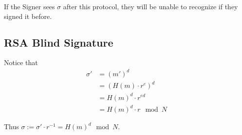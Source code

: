 If the Signer sees $\sigma$ after this protocol, they will be unable to recognize if they signed it before.

\subsection{RSA Blind Signature}


Notice that 
\begin{align*}
    \sigma' &= (m')^d \\
    &= (H(m)\cdot r^e)^d \\
    &= H(m)^d \cdot r^{ed} \\
    &= H(m)^d \cdot r \mod N
\end{align*}

Thus $\sigma := \sigma' \cdot r^{-1} = H(m)^d \mod N$.
